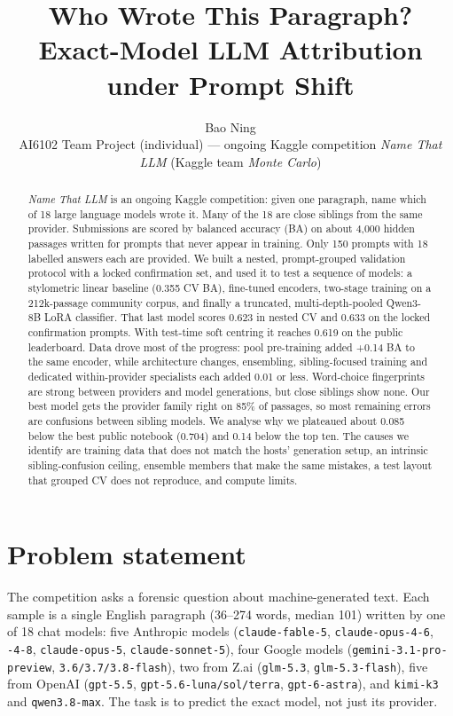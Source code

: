 \documentclass[10pt,twocolumn,letterpaper]{article}
\title{\vspace{-0.6cm}Who Wrote This Paragraph?\\Exact-Model LLM Attribution under Prompt Shift}
\author{
Bao Ning\\[4pt]
\small AI6102 Team Project (individual) --- ongoing Kaggle competition \emph{Name That LLM} (Kaggle team \emph{Monte Carlo})
}
\date{\vspace{-0.8cm}}
\begin{document}
\maketitle

\begin{abstract}
\emph{Name That LLM} is an ongoing Kaggle competition: given one paragraph, name which of 18 large language models wrote it. Many of the 18 are close siblings from the same provider. Submissions are scored by balanced accuracy (BA) on about 4,000 hidden passages written for prompts that never appear in training. Only 150 prompts with 18 labelled answers each are provided. We built a nested, prompt-grouped validation protocol with a locked confirmation set, and used it to test a sequence of models: a stylometric linear baseline (0.355 CV BA), fine-tuned encoders, two-stage training on a 212k-passage community corpus, and finally a truncated, multi-depth-pooled Qwen3-8B LoRA classifier. That last model scores 0.623 in nested CV and 0.633 on the locked confirmation prompts. With test-time soft centring it reaches 0.619 on the public leaderboard. Data drove most of the progress: pool pre-training added +0.14 BA to the same encoder, while architecture changes, ensembling, sibling-focused training and dedicated within-provider specialists each added 0.01 or less. Word-choice fingerprints are strong between providers and model generations, but close siblings show none. Our best model gets the provider family right on 85\% of passages, so most remaining errors are confusions between sibling models. We analyse why we plateaued about 0.085 below the best public notebook (0.704) and 0.14 below the top ten. The causes we identify are training data that does not match the hosts' generation setup, an intrinsic sibling-confusion ceiling, ensemble members that make the same mistakes, a test layout that grouped CV does not reproduce, and compute limits.
\end{abstract}

\section{Problem statement}
\label{sec:problem}

The competition asks a forensic question about machine-generated text. Each sample is a single English paragraph (36--274 words, median 101) written by one of 18 chat models: five Anthropic models (\texttt{claude-fable-5}, \texttt{claude-opus-4-6}, \texttt{-4-8}, \texttt{claude-opus-5}, \texttt{claude-sonnet-5}), four Google models (\texttt{gemini-3.1-pro-preview}, \texttt{3.6/3.7/3.8-flash}), two from Z.ai (\texttt{glm-5.3}, \texttt{glm-5.3-flash}), five from OpenAI (\texttt{gpt-5.5}, \texttt{gpt-5.6-luna/sol/terra}, \texttt{gpt-6-astra}), and \texttt{kimi-k3} and \texttt{qwen3.8-max}. The task is to predict the exact model, not just its provider.
\end{document}
